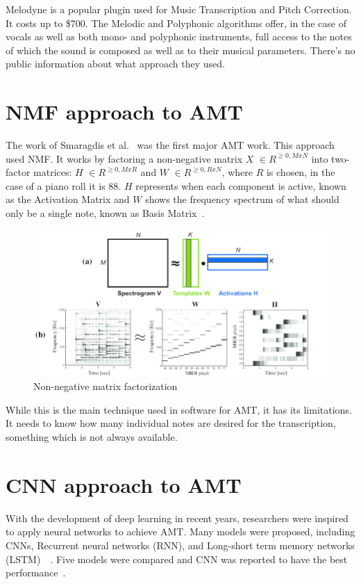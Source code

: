 Melodyne is a popular plugin used for Music Transcription and Pitch Correction. It costs up to \$700. 	
The Melodic and Polyphonic algorithms offer, in the case of vocals as well as both mono- and polyphonic instruments, full access to the notes of which the sound is composed as well as to their musical parameters.
There's no public information about what approach they used.
\par

\section{NMF approach to AMT}
The work of Smaragdis et al.~\cite{REF:8} was the first major AMT work. This approach used NMF. It works by factoring a non-negative matrix $X$ $\in R^{\geq 0, MxN}$ into two-factor matrices: $H$ $\in R^{\geq 0, MxR}$ and $W$ $\in R^{\geq 0, RxN}$, where $R$ is chosen, in the case of a piano roll it is 88. $H$ represents when each component is active, known as the Activation Matrix and $W$ shows the frequency spectrum of what should only be a single note, known as Basis Matrix~\cite{NMF}.
\par

\begin{figure}[h]
	\caption[Non-negative matrix factorization]{Non-negative matrix factorization~\cite{NMF_figure}}
	\centering
	\includegraphics[width=1\textwidth, height=\textheight, keepaspectratio]{"resources/NMF"}
\end{figure}

While this is the main technique used in software for AMT, it has its limitations. It needs to know how many individual notes are desired for the transcription, something which is not always available.

\section{CNN approach to AMT}
With the development of deep learning in recent years, researchers were inspired to apply neural networks to achieve AMT. Many models were proposed, including CNNs, Recurrent neural networks (RNN), and Long-short term memory networks (LSTM)~\cite{REF:1}~\cite{REF:5}. Five models were compared and CNN was reported to have the best performance~\cite{REF:7}. 
\par

